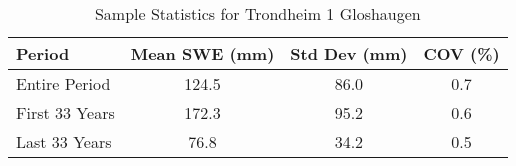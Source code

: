 
    \begin{table}[h!]
        \centering
        \caption{Sample Statistics for Trondheim 1 Gloshaugen}
        \begin{tabular}{lccc} 
            \toprule
            \textbf{Period} & \textbf{Mean SWE (mm)} & \textbf{Std Dev (mm)} & \textbf{COV (\%)} \\
            \midrule
            Entire Period & 124.5 & 86.0 & 0.7 \\
            First 33 Years & 172.3 & 95.2 & 0.6 \\
            Last 33 Years & 76.8 & 34.2 & 0.5 \\
            \bottomrule
        \end{tabular}
        \label{tab:sample_stats_Trondheim 1 Gloshaugen}
    \end{table}
    